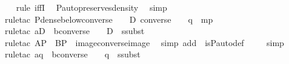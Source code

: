 \begin{isabellebody}
%
\isadelimproof
\ \ %
\endisadelimproof
%
\isatagproof
{}\isamarkupfalse%
\ {\isacharparenleft}{\kern0pt}rule\ iffI{\isacharparenright}{\kern0pt}\ \isamarkupfalse%
\ P{\isacharunderscore}{\kern0pt}auto{\isacharunderscore}{\kern0pt}preserves{\isacharunderscore}{\kern0pt}density\ \isamarkupfalse%
\ simp\ \isanewline
\ \ \isamarkupfalse%
\ {\isacharparenleft}{\kern0pt}rule{\isacharunderscore}{\kern0pt}tac\ P{\isacharequal}{\kern0pt}{\isachardoublequoteopen}dense{\isacharunderscore}{\kern0pt}below{\isacharparenleft}{\kern0pt}converse{\isacharparenleft}{\kern0pt}{\isasympi}{\isacharparenright}{\kern0pt}\ {\isacharbackquote}{\kern0pt}{\isacharbackquote}{\kern0pt}\ {\isacharparenleft}{\kern0pt}{\isasympi}\ {\isacharbackquote}{\kern0pt}{\isacharbackquote}{\kern0pt}\ D{\isacharparenright}{\kern0pt}{\isacharcomma}{\kern0pt}\ converse{\isacharparenleft}{\kern0pt}{\isasympi}{\isacharparenright}{\kern0pt}\ {\isacharbackquote}{\kern0pt}\ {\isacharparenleft}{\kern0pt}{\isasympi}\ {\isacharbackquote}{\kern0pt}\ q{\isacharparenright}{\kern0pt}{\isacharparenright}{\kern0pt}{\isachardoublequoteclose}\ \ mp{\isacharparenright}{\kern0pt}\isanewline
\ \ \isamarkupfalse%
\ {\isacharparenleft}{\kern0pt}rule{\isacharunderscore}{\kern0pt}tac\ a{\isacharequal}{\kern0pt}D\ \ b{\isacharequal}{\kern0pt}{\isachardoublequoteopen}converse{\isacharparenleft}{\kern0pt}{\isasympi}{\isacharparenright}{\kern0pt}\ {\isacharbackquote}{\kern0pt}{\isacharbackquote}{\kern0pt}\ {\isacharparenleft}{\kern0pt}{\isasympi}\ {\isacharbackquote}{\kern0pt}{\isacharbackquote}{\kern0pt}\ D{\isacharparenright}{\kern0pt}{\isachardoublequoteclose}\ \ ssubst{\isacharparenright}{\kern0pt}\isanewline
\ \ \isamarkupfalse%
\ {\isacharparenleft}{\kern0pt}rule{\isacharunderscore}{\kern0pt}tac\ A{\isacharequal}{\kern0pt}P\ \ B{\isacharequal}{\kern0pt}P\ \ image{\isacharunderscore}{\kern0pt}converse{\isacharunderscore}{\kern0pt}image{\isacharparenright}{\kern0pt}\ \isamarkupfalse%
\ {\isacharparenleft}{\kern0pt}simp\ add\ {\isacharcolon}{\kern0pt}\ is{\isacharunderscore}{\kern0pt}P{\isacharunderscore}{\kern0pt}auto{\isacharunderscore}{\kern0pt}def{\isacharparenright}{\kern0pt}\ \isanewline
\ \ \isamarkupfalse%
\ simp\ \isanewline
\ \ \isamarkupfalse%
\ {\isacharparenleft}{\kern0pt}rule{\isacharunderscore}{\kern0pt}tac\ a{\isacharequal}{\kern0pt}q\ \ b{\isacharequal}{\kern0pt}{\isachardoublequoteopen}converse{\isacharparenleft}{\kern0pt}{\isasympi}{\isacharparenright}{\kern0pt}\ {\isacharbackquote}{\kern0pt}\ {\isacharparenleft}{\kern0pt}{\isasympi}\ {\isacharbackquote}{\kern0pt}\ q{\isacharparenright}{\kern0pt}{\isachardoublequoteclose}\ \ ssubst{\isacharparenright}{\kern0pt}\isanewline

\end{isabellebody}
